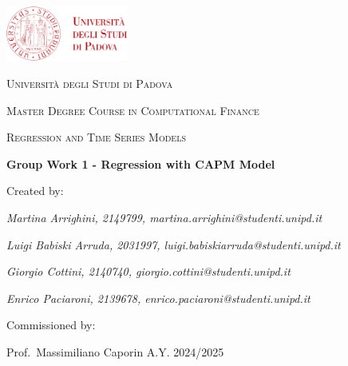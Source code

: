 \documentclass[12pt, openright, oneside]{report}
\begin{document}

    \begin{titlepage}
        \centering
        \includegraphics[width=0.3\textwidth]{images/logo_unipd.png}\par\vspace{1cm}
        {\scshape\LARGE Università degli Studi di Padova \par}
        \vspace{1.5cm}
        {\scshape\Large Master Degree Course in Computational Finance \par}
        \vspace{.2cm}
        {\scshape\large Regression and Time Series Models \par}
        \vspace{2cm}
        {\Large\bfseries Group Work 1 - Regression with CAPM Model\par}
        \vspace{2cm}
        Created by:\par
        {\itshape{Martina Arrighini, 2149799, martina.arrighini@studenti.unipd.it}\par}
        {\itshape Luigi Babiski Arruda, 2031997, luigi.babiskiarruda@studenti.unipd.it\par}
        {\itshape Giorgio Cottini, 2140740, giorgio.cottini@studenti.unipd.it \par}
        {\itshape Enrico Paciaroni, 2139678, enrico.paciaroni@studenti.unipd.it \par}
        \vfill
        Commissioned by:\par
        Prof.\ Massimiliano Caporin
        \vfill
        {\large A.Y. 2024/2025}
    \end{titlepage}

\setcounter{page}{1}


\tableofcontents

\chapter{}
\label{chapter:download}
\end{document}
